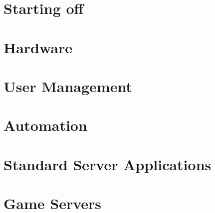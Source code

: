\documentclass[11pt, a4paper, final]{report}
\begin{document}

%
\part{Starting off}







\part{Hardware}
\label{part:hardware}


\part{User Management}


\part{Automation}



\part{Standard Server Applications}








\part{Game Servers}



\end{document}
